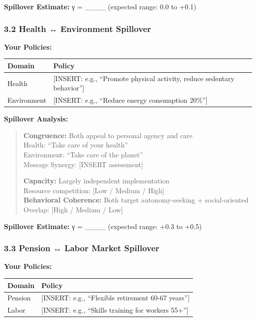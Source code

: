 \textbf{Spillover Estimate:} γ = \_\_\_\_ (expected range: 0.0 to +0.1)

\subsubsection*{3.2 Health ↔ Environment Spillover}

\textbf{Your Policies:}
\begin{center}
\begin{tabular}{@{}ll@{}}
\toprule
\textbf{Domain} & \textbf{Policy} \\
\midrule
Health & [INSERT: e.g., ``Promote physical activity, reduce sedentary behavior''] \\
Environment & [INSERT: e.g., ``Reduce energy consumption 20\%''] \\
\midrule
\end{tabular}
\end{center}

\textbf{Spillover Analysis:}

\begin{quote}
\textbf{Congruence:} Both appeal to personal agency and care \\
Health: ``Take care of your health'' \\
Environment: ``Take care of the planet'' \\
Message Synergy: [INSERT assessment]

\textbf{Capacity:} Largely independent implementation \\
Resource competition: [Low / Medium / High] \\

\textbf{Behavioral Coherence:} Both target autonomy-seeking + social-oriented \\
Overlap: [High / Medium / Low]
\end{quote}

\textbf{Spillover Estimate:} γ = \_\_\_\_ (expected range: +0.3 to +0.5)

\subsubsection*{3.3 Pension ↔ Labor Market Spillover}

\textbf{Your Policies:}
\begin{center}
\begin{tabular}{@{}ll@{}}
\toprule
\textbf{Domain} & \textbf{Policy} \\
\midrule
Pension & [INSERT: e.g., ``Flexible retirement 60-67 years''] \\
Labor & [INSERT: e.g., ``Skills training for workers 55+''] \\
\midrule
\end{tabular}
\end{center}

